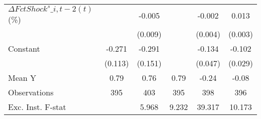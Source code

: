 {\begin{tabular}{l*{5}{c}}
\addlinespace
$ \Delta FctShock^s\_{i,t-2}(t)$ (\%)&                     &      -0.005         &                     &      -0.002         &       0.013\sym{***}\\
                    &                     &     (0.009)         &                     &     (0.004)         &     (0.003)         \\
\addlinespace
Constant            &      -0.271\sym{**} &      -0.291\sym{*}  &                     &      -0.134\sym{***}&      -0.102\sym{***}\\
                    &     (0.113)         &     (0.151)         &                     &     (0.047)         &     (0.029)         \\
\midrule
Mean Y              &        0.79         &        0.76         &        0.79         &       -0.24         &       -0.08         \\
Observations        &         395         &         403         &         395         &         398         &         396         \\
Exc. Inst. F-stat   &                     &       5.968         &       9.232         &      39.317         &      10.173         \\
\bottomrule
\end{tabular}
}
